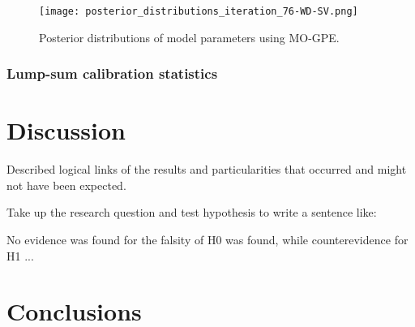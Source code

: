 \documentclass[draft,linenumbers,onecolumn]{agujournal2019} %
\begin{document}
\begin{figure}[htbp]
	\centering
	\texttt{[image: posterior\_distributions\_iteration\_76-WD-SV.png]}
	\caption{Posterior distributions of model parameters using MO-GPE.}
	\label{fig:posterior_distributions}
\end{figure}

\subsubsection{Lump-sum calibration statistics}




\section{Discussion}

Described logical links of the results and particularities that occurred and might not have been expected.

Take up the research question and test hypothesis to write a sentence like:

No evidence was found for the falsity of H0 was found, while counterevidence for H1 ...

\section{Conclusions}


%
%
%
%
%
%



\acknowledgments



%
%
\end{document}
